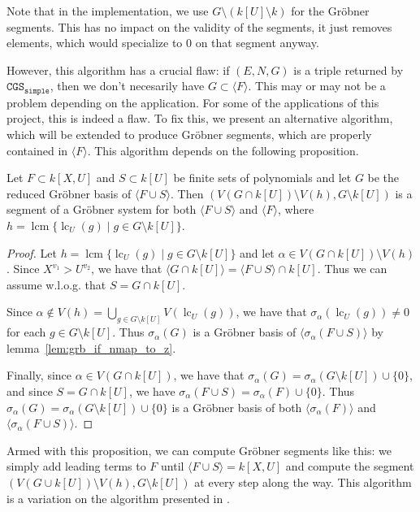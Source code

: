 \documentclass[a4paper, 12pt]{article}
\DeclareMathOperator{\LC}{lc}
\DeclareMathOperator{\lcm}{lcm}
\theoremstyle{changedot}
\theoremstyle{changedotbreak}
\theoremstyle{nonumberplain}
\newtheorem{proof}{Proof}
\begin{document}
Note that in the implementation, we use $G \setminus (k[U] \setminus k)$ for the Gröbner segments. This has no impact on the validity of the segments, it just removes elements, which would specialize to 0 on that segment anyway.


However, this algorithm has a crucial flaw: if $(E, N, G)$ is a triple returned by $\mathtt{CGS_{simple}}$, then we don't necesarily have $G \subset \langle F \rangle$. This may or may not be a problem depending on the application. For some of the applications of this project, this is indeed a flaw.
To fix this, we present an alternative algorithm, which will be extended to produce Gröbner segments, which are properly contained in $\langle F \rangle$. This algorithm depends on the following proposition.

\begin{proposition}\label{prop:segment}
  Let $F \subset k[X, U]$ and $S \subset k[U]$ be finite sets of polynomials and let $G$ be the reduced Gröbner basis of $\langle F \cup S \rangle$. Then $(V(G \cap k[U]) \setminus V(h), G \setminus k[U])$ is a segment of a Gröbner system for both $\langle F \cup S \rangle$ and $\langle F \rangle$, where $h = \lcm\{\LC_{U}(g) \mid g \in G \setminus k[U]\}$.
\end{proposition}
\begin{proof}
  Let $h = \lcm\{\LC_{U}(g) \mid g \in G \setminus k[U]\}$ and let $\alpha \in V(G \cap k[U]) \setminus V(h)$. Since $X^{v_{1}} > U^{v_{2}}$, we have that $\langle G \cap k[U] \rangle = \langle F \cup S \rangle \cap k[U]$. Thus we can assume w.l.o.g. that $S = G \cap k[U]$.

  Since $\alpha \notin V(h) = \bigcup_{g \in G \setminus k[U]} V(\LC_{U}(g))$, we have that $\sigma_{\alpha}(\LC_{U}(g)) \neq 0$ for each $g \in G \setminus k[U]$. Thus $\sigma_{\alpha}(G)$ is a Gröbner basis of $\langle \sigma_{\alpha}(F \cup S) \rangle$ by lemma~\ref{lem:grb_if_nmap_to_z}.

  Finally, since $\alpha \in V(G \cap k[U])$, we have that $\sigma_{\alpha}(G) = \sigma_{\alpha}(G \setminus k[U]) \cup \{0\}$, and since $S = G \cap k[U]$, we have $\sigma_{\alpha}(F \cup S) = \sigma_{\alpha}(F) \cup \{0\}$. Thus $\sigma_{\alpha}(G) = \sigma_{\alpha}(G \setminus k[U]) \cup \{0\}$ is a Gröbner basis of both $\langle \sigma_{\alpha}(F) \rangle$ and $\langle \sigma_{\alpha}(F \cup S) \rangle$.
\end{proof}

Armed with this proposition, we can compute Gröbner segments like this: we simply add leading terms to $F$ until $\langle F \cup S \rangle = k[X, U]$ and compute the segment $(V(G \cup k[U]) \setminus V(h), G \setminus k[U])$ at every step along the way. This algorithm is a variation on the algorithm presented in \cite{ss_algo}.
\end{document}
